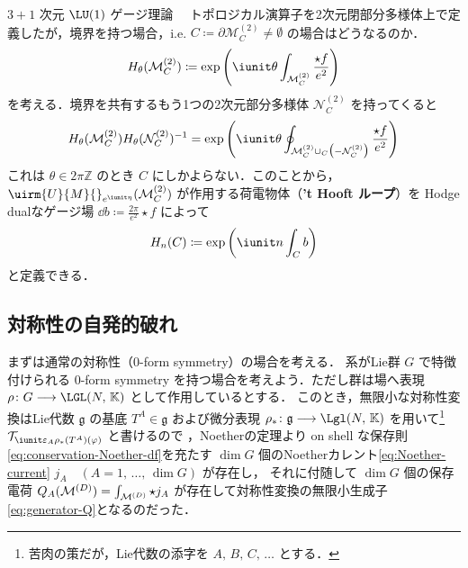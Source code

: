 \documentclass[TQFT_main]{subfiles}
\begin{document}
\begin{myexample}[label=ex:3-2]{$3+1$ 次元 $\LU(1)$ ゲージ理論}
    　トポロジカル演算子を2次元閉部分多様体上で定義したが，境界を持つ場合，i.e. $C \coloneqq \partial \mathcal{M}^{(2)}_C \neq \emptyset$ の場合はどうなるのか．
    \begin{align}
        H_\theta(\mathcal{M}^{(2)}_C) \coloneqq \exp \left( \iunit \theta \int_{\mathcal{M}^{(2)}_C} \frac{\star f}{e^2} \right)
    \end{align}
    を考える．境界を共有するもう1つの2次元部分多様体 $\mathcal{N}^{(2)}_C$ を持ってくると
    \begin{align}
        H_\theta(\mathcal{M}^{(2)}_C)H_\theta(\mathcal{N}^{(2)}_C)^{-1} = \exp \left( \iunit \theta \oint_{\mathcal{M}^{(2)}_C \cup_C \bigl(- \mathcal{N}^{(2)}_C\bigr)} \frac{\star f}{e^2} \right)
    \end{align}
    これは $\theta \in 2\pi \mathbb{Z}$ のとき $C$ にしかよらない．このことから，$\uirm{U}{M}{}_{e^{\iunit \eta}}(\mathcal{M}^{(2)}_C)$ が作用する荷電物体（\textbf{'t Hooft ループ}）を
    Hodge dualなゲージ場 $\dd{b} \coloneqq \frac{2\pi}{e^2} \star f$ によって
    \begin{align}
        H_n (C) \coloneqq \exp \left( \iunit n \int_C b \right) 
    \end{align}
    と定義できる．

\end{myexample}

\subsection{対称性の自発的破れ}

まずは通常の対称性（$0$-form symmetry）の場合を考える．
系がLie群 $G$ で特徴付けられる $0$-form symmetry を持つ場合を考えよう．ただし群は場へ表現 $\rho \colon G \lto \LGL(N,\, \mathbb{K})$ として作用しているとする．
このとき，無限小な対称性変換はLie代数 $\mathfrak{g}$ の基底 $T^A \in \mathfrak{g}$ および微分表現 $\rho_* \colon \mathfrak{g} \lto \Lgl (N,\, \mathbb{K})$ を用いて\footnote{苦肉の策だが，Lie代数の添字を $A,\, B,\, C,\, \dots$ とする．} 
$\mathcal{T}_{\iunit\varepsilon_A \rho_*(T^A)(\varphi)}$ と書けるので
，Noetherの定理より on shell な保存則\eqref{eq:conservation-Noether-df}を充たす $\dim G$ 個のNoetherカレント\eqref{eq:Noether-current} $j_A\quad (A = 1,\, \dots,\, \dim G)$ が存在し，
それに付随して $\dim G$ 個の保存電荷 $Q_A(\mathcal{M}^{(D)}) = \int_{\mathcal{M}^{(D)}} \star j_A$ が存在して対称性変換の無限小生成子\eqref{eq:generator-Q}となるのだった．
\end{document}
